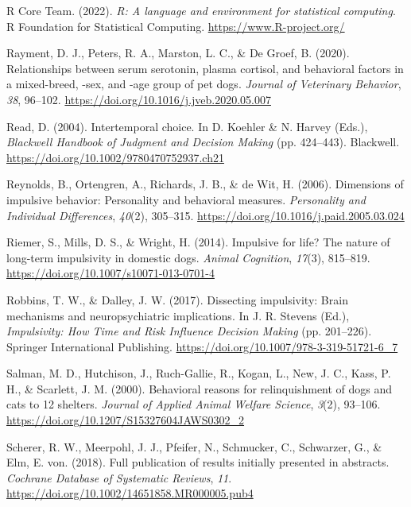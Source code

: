 \documentclass[
  ,pub,floatsintext]{apa6}
\newlength{\cslhangindent}
\newlength{\cslentryspacingunit} %
\newenvironment{CSLReferences}[2] %
 {%
  \setlength{\parindent}{0pt}
  \ifodd #1
  \let\oldpar\par
  \def\par{\hangindent=\cslhangindent\oldpar}
  \fi
  \setlength{\parskip}{#2\cslentryspacingunit}
 }%
 {}
\begin{document}
\begin{CSLReferences}{1}{0}
\leavevmode{}%
R Core Team. (2022). \emph{R: A language and environment for statistical computing}. R Foundation for Statistical Computing. \url{https://www.R-project.org/}

\leavevmode{}%
Rayment, D. J., Peters, R. A., Marston, L. C., \& De Groef, B. (2020). Relationships between serum serotonin, plasma cortisol, and behavioral factors in a mixed-breed, -sex, and -age group of pet dogs. \emph{Journal of Veterinary Behavior}, \emph{38}, 96--102. \url{https://doi.org/10.1016/j.jveb.2020.05.007}

\leavevmode{}%
Read, D. (2004). Intertemporal choice. In D. Koehler \& N. Harvey (Eds.), \emph{Blackwell {Handbook} of {Judgment} and {Decision Making}} (pp. 424--443). {Blackwell}. \url{https://doi.org/10.1002/9780470752937.ch21}

\leavevmode{}%
Reynolds, B., Ortengren, A., Richards, J. B., \& de Wit, H. (2006). Dimensions of impulsive behavior: Personality and behavioral measures. \emph{Personality and Individual Differences}, \emph{40}(2), 305--315. \url{https://doi.org/10.1016/j.paid.2005.03.024}

\leavevmode{}%
Riemer, S., Mills, D. S., \& Wright, H. (2014). Impulsive for life? {The} nature of long-term impulsivity in domestic dogs. \emph{Animal Cognition}, \emph{17}(3), 815--819. \url{https://doi.org/10.1007/s10071-013-0701-4}

\leavevmode{}%
Robbins, T. W., \& Dalley, J. W. (2017). Dissecting impulsivity: Brain mechanisms and neuropsychiatric implications. In J. R. Stevens (Ed.), \emph{Impulsivity: {How Time} and {Risk Influence Decision Making}} (pp. 201--226). {Springer International Publishing}. \url{https://doi.org/10.1007/978-3-319-51721-6_7}

\leavevmode{}%
Salman, M. D., Hutchison, J., Ruch-Gallie, R., Kogan, L., New, J. C., Kass, P. H., \& Scarlett, J. M. (2000). Behavioral reasons for relinquishment of dogs and cats to 12 shelters. \emph{Journal of Applied Animal Welfare Science}, \emph{3}(2), 93--106. \url{https://doi.org/10.1207/S15327604JAWS0302_2}

\leavevmode{}%
Scherer, R. W., Meerpohl, J. J., Pfeifer, N., Schmucker, C., Schwarzer, G., \& Elm, E. von. (2018). Full publication of results initially presented in abstracts. \emph{Cochrane Database of Systematic Reviews}, \emph{11}. \url{https://doi.org/10.1002/14651858.MR000005.pub4}


\end{CSLReferences}
\end{document}
